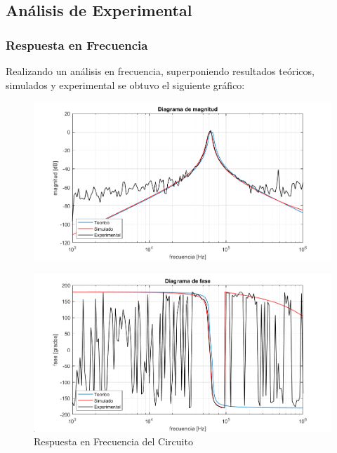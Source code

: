 \subsection{Análisis de Experimental}

\subsubsection{Respuesta en Frecuencia}

Realizando un análisis en frecuencia, superponiendo resultados teóricos, simulados y experimental se obtuvo el siguiente gráfico:

\begin{figure}[H]
    \centering
    \includegraphics[scale = 0.6]{bodemag.png}
\end{figure}
\begin{figure}[H]
    \centering
    \includegraphics[scale = 0.6]{bodepha.png}
    \caption{Respuesta en Frecuencia del Circuito}
    \label{ej22bode}
\end{figure}

